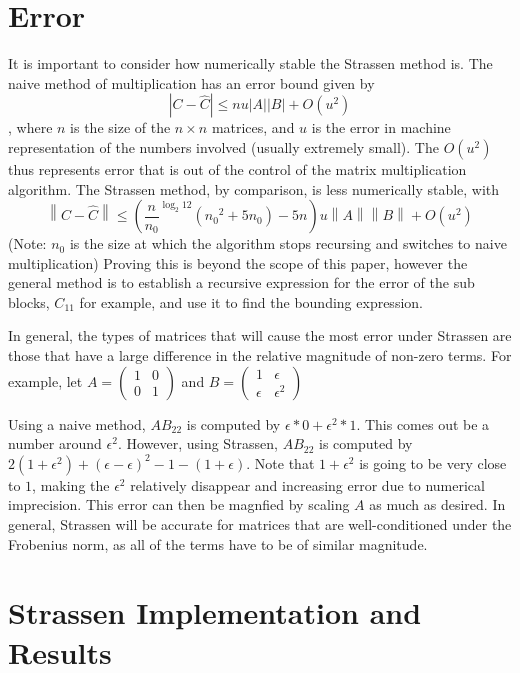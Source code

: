 \documentclass{article}         %
\newcommand{\norm}[1]{\left\lVert#1\right\rVert} %
\begin{document}
\section*{Error}
It is important to consider how numerically stable the Strassen method is. The naive method of multiplication has an error bound given by $$|C-\hat{C}|\leq nu|A||B|+O(u^2)$$, where $n$ is the size of the $n\times n$ matrices, and $u$ is the error in machine representation of the numbers involved (usually extremely small). The $O(u^2)$ thus represents error that is out of the control of the matrix multiplication algorithm.
The Strassen method, by comparison, is less numerically stable, with $$\norm{C-\hat{C}}\leq ({\frac{n}{n_0}}^{\log_2 12}({n_0}^2+5n_0)-5n)u\norm{A}\norm{B}+O(u^2)$$
(Note: $n_0$ is the size at which the algorithm stops recursing and switches to naive multiplication) Proving this is beyond the scope of this paper, however the general method is to establish a recursive expression for the error of the sub blocks, $C_{11}$ for example, and use it to find the bounding expression.

In general, the types of matrices that will cause the most error under Strassen are those that have a large difference in the relative magnitude of non-zero terms. For example, let $A=\begin{pmatrix}
1 & 0 \\
0 & 1
\end{pmatrix}$
and $B=\begin{pmatrix}
1 & \epsilon \\
\epsilon & \epsilon^2
\end{pmatrix}$

Using a naive method, $AB_{22}$ is computed by $\epsilon*0+\epsilon^2*1$. This comes out be a number around $\epsilon^2$. However, using Strassen, $AB_{22}$ is computed by $2(1+\epsilon^2)+(\epsilon-\epsilon)^2-1-(1+\epsilon)$. Note that $1+\epsilon^2$ is going to be very close to $1$, making the $\epsilon^2$ relatively disappear and increasing error due to numerical imprecision. This error can then be magnfied by scaling $A$ as much as desired.
In general, Strassen will be accurate for matrices that are well-conditioned under the Frobenius norm, as all of the terms have to be of similar magnitude.

\section*{Strassen Implementation and Results}
\end{document}
